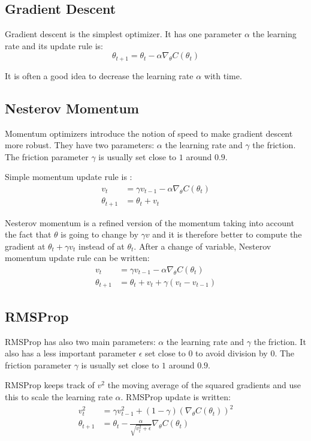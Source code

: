 \documentclass{article} %
\begin{document}
\subsection{Gradient Descent}
Gradient descent is the simplest optimizer. It has one parameter $\alpha$ the learning rate and its update rule is:
$$
\theta_{t+1} = \theta_t - \alpha \nabla_{\theta} C (\theta_t)
$$

It is often a good idea to decrease the learning rate $\alpha$ with time.

\subsection{Nesterov Momentum}
Momentum optimizers introduce the notion of speed to make gradient descent more robust. They have two parameters: $\alpha$ the learning rate and $\gamma$ the friction. The friction parameter $\gamma$ is usually set close to $1$ around $0.9$.

Simple momentum update rule is :
$$
\begin{aligned}
v_{t}         &= \gamma v_{t-1} - \alpha \nabla_{\theta} C (\theta_t) \\
\theta_{t+1} &= \theta_t + v_{t}
\end{aligned}
$$

Nesterov momentum is a refined version of the momentum taking into account the fact that $\theta$ is going to change by $\gamma v$ and it is therefore better to compute the gradient at $\theta_t + \gamma v_t$ instead of at $\theta_t$. After a change of variable, Nesterov momentum update rule can be written:
$$
\begin{aligned}
v_{t}         &= \gamma v_{t-1} - \alpha \nabla_{\theta} C (\theta_t) \\
\theta_{t+1} &= \theta_t + v_{t} + \gamma (v_{t}-v_{t-1})
\end{aligned}
$$

\subsection{RMSProp}
RMSProp has also two main parameters: $\alpha$ the learning rate and $\gamma$ the friction. It also has a less important parameter $\epsilon$ set close to $0$ to avoid division by 0. The friction parameter $\gamma$ is usually set close to $1$ around $0.9$.

RMSProp keeps track of $v^2$ the moving average of the squared gradients  and use this to scale the learning rate $\alpha$. RMSProp update is written:
$$
\begin{aligned}
v_{t}^2   &= \gamma v_{t-1}^2 + (1-\gamma) (\nabla_{\theta} C (\theta_t))^2 \\
\theta_{t+1} &= \theta_t -\frac{\alpha}{\sqrt{v_{t}^2+\epsilon}} \nabla_{\theta} C (\theta_t)
\end{aligned}
$$
\end{document}
